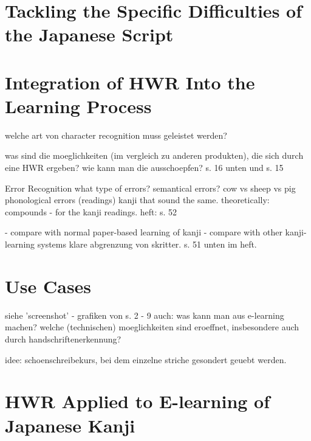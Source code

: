 \section{Tackling the Specific Difficulties of the Japanese Script}
\label{sec:concept:tacklingdifficulties}


\section{Integration of HWR Into the Learning Process}
\label{sec:concept:integrationofhwrintolearning}


welche art von character recognition muss geleistet werden?

was sind die moeglichkeiten (im vergleich zu anderen produkten),
die sich durch eine HWR ergeben?
wie kann man die ausschoepfen? s. 16 unten und s. 15

Error Recognition
what type of errors?
semantical errors? cow vs sheep vs pig
phonological errors (readings) kanji that sound the same.
theoretically: compounds - for the kanji readings.
heft: s. 52

- compare with normal paper-based learning of kanji
- compare with other kanji-learning systems
klare abgrenzung von skritter.
s. 51 unten im heft.



\section{Use Cases}
\label{sec:concept:usecases}

siehe 'screenshot' - grafiken von s. 2 - 9
auch: was kann man aus e-learning machen?
welche (technischen) moeglichkeiten sind eroeffnet,
insbesondere auch durch handschriftenerkennung?

idee: schoenschreibekurs, bei dem einzelne striche
gesondert geuebt werden.


\section{HWR Applied to E-learning of Japanese Kanji}
